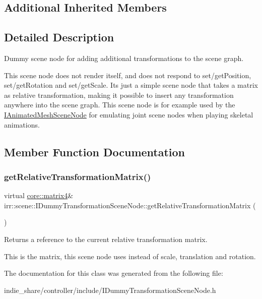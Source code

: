 \subsection*{Additional Inherited Members}


\subsection{Detailed Description}
Dummy scene node for adding additional transformations to the scene graph. 

This scene node does not render itself, and does not respond to set/get\+Position, set/get\+Rotation and set/get\+Scale. Its just a simple scene node that takes a matrix as relative transformation, making it possible to insert any transformation anywhere into the scene graph. This scene node is for example used by the \hyperlink{classirr_1_1scene_1_1IAnimatedMeshSceneNode}{I\+Animated\+Mesh\+Scene\+Node} for emulating joint scene nodes when playing skeletal animations. 

\subsection{Member Function Documentation}
\mbox{\label{classirr_1_1scene_1_1IDummyTransformationSceneNode_a95612d8bb225213c907fbf5a2606f0d3}} 
\subsubsection{\texorpdfstring{get\+Relative\+Transformation\+Matrix()}{getRelativeTransformationMatrix()}}
{\footnotesize\ttfamily virtual \hyperlink{namespaceirr_1_1core_a73fa92e638c5ca97efd72da307cc9b65}{core\+::matrix4}\& irr\+::scene\+::\+I\+Dummy\+Transformation\+Scene\+Node\+::get\+Relative\+Transformation\+Matrix (\begin{DoxyParamCaption}{ }\end{DoxyParamCaption})\hspace{0.3cm}{\ttfamily [pure virtual]}}



Returns a reference to the current relative transformation matrix. 

This is the matrix, this scene node uses instead of scale, translation and rotation. 

The documentation for this class was generated from the following file\+:\begin{DoxyCompactItemize}
\item 
indie\+\_\+share/controller/include/I\+Dummy\+Transformation\+Scene\+Node.\+h\end{DoxyCompactItemize}
